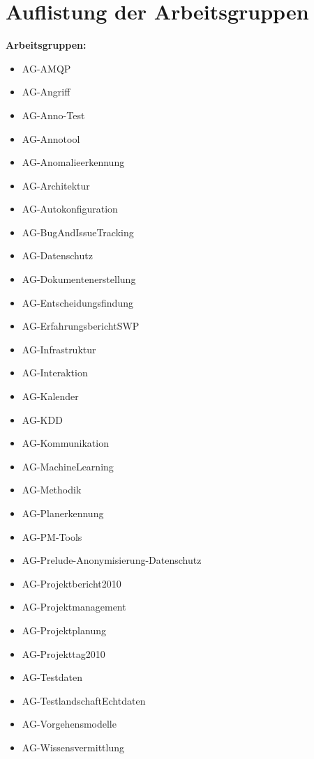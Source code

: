 \section{Auflistung der Arbeitsgruppen}
\label{sec:list-wgs}

\begin{multicols}{2}
  \raggedright
  \textbf{Arbeitsgruppen:}
  \begin{itemize}
	  \item AG-AMQP
	  \item AG-Angriff
	  \item AG-Anno-Test
	  \item AG-Annotool
	  \item AG-Anomalieerkennung
	  \item AG-Architektur
	  \item AG-Autokonfiguration
	  \item AG-BugAndIssueTracking
	  \item AG-Datenschutz
	  \item AG-Dokumentenerstellung
	  \item AG-Entscheidungsfindung
	  \item AG-ErfahrungsberichtSWP
	  \item AG-Infrastruktur
	  \item AG-Interaktion
	  \item AG-Kalender
	  \item AG-KDD
	  \item AG-Kommunikation
	  \item AG-MachineLearning
	  \item AG-Methodik
	  \item AG-Planerkennung
	  \item AG-PM-Tools
	  \item AG-Prelude-Anonymisierung-Datenschutz
	  \item AG-Projektbericht2010
	  \item AG-Projektmanagement
	  \item AG-Projektplanung
	  \item AG-Projekttag2010
	  \item AG-Testdaten
	  \item AG-TestlandschaftEchtdaten
	  \item AG-Vorgehensmodelle
	  \item AG-Wissensvermittlung
  \end{itemize}
  

\end{multicols}
